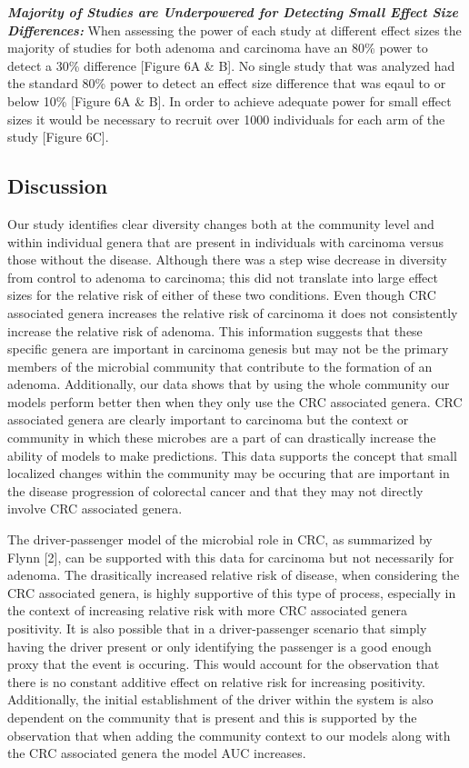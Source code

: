 \documentclass[12pt,]{article}
\begin{document}
\textbf{\emph{Majority of Studies are Underpowered for Detecting Small
Effect Size Differences:}} When assessing the power of each study at
different effect sizes the majority of studies for both adenoma and
carcinoma have an 80\% power to detect a 30\% difference {[}Figure 6A \&
B{]}. No single study that was analyzed had the standard 80\% power to
detect an effect size difference that was eqaul to or below 10\%
{[}Figure 6A \& B{]}. In order to achieve adequate power for small
effect sizes it would be necessary to recruit over 1000 individuals for
each arm of the study {[}Figure 6C{]}.

\newpage

\subsection{Discussion}\label{discussion}

Our study identifies clear diversity changes both at the community level
and within individual genera that are present in individuals with
carcinoma versus those without the disease. Although there was a step
wise decrease in diversity from control to adenoma to carcinoma; this
did not translate into large effect sizes for the relative risk of
either of these two conditions. Even though CRC associated genera
increases the relative risk of carcinoma it does not consistently
increase the relative risk of adenoma. This information suggests that
these specific genera are important in carcinoma genesis but may not be
the primary members of the microbial community that contribute to the
formation of an adenoma. Additionally, our data shows that by using the
whole community our models perform better then when they only use the
CRC associated genera. CRC associated genera are clearly important to
carcinoma but the context or community in which these microbes are a
part of can drastically increase the ability of models to make
predictions. This data supports the concept that small localized changes
within the community may be occuring that are important in the disease
progression of colorectal cancer and that they may not directly involve
CRC associated genera.

The driver-passenger model of the microbial role in CRC, as summarized
by Flynn {[}2{]}, can be supported with this data for carcinoma but not
necessarily for adenoma. The drasitically increased relative risk of
disease, when considering the CRC associated genera, is highly
supportive of this type of process, especially in the context of
increasing relative risk with more CRC associated genera positivity. It
is also possible that in a driver-passenger scenario that simply having
the driver present or only identifying the passenger is a good enough
proxy that the event is occuring. This would account for the observation
that there is no constant additive effect on relative risk for
increasing positivity. Additionally, the initial establishment of the
driver within the system is also dependent on the community that is
present and this is supported by the observation that when adding the
community context to our models along with the CRC associated genera the
model AUC increases.
\end{document}
